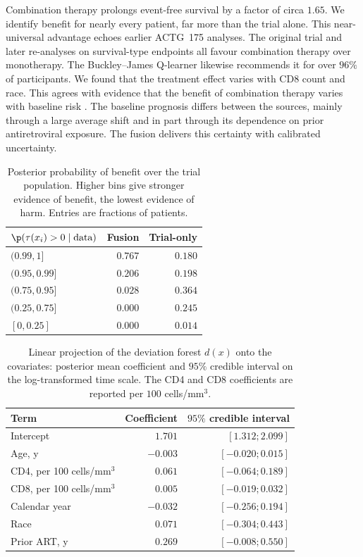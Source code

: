 Combination therapy prolongs event-free survival by a factor of circa $1.65$.
We identify benefit for nearly every patient, far more than the trial alone.
This near-universal advantage echoes earlier ACTG~175 analyses.
The original trial \citep{hammer1996} and later re-analyses on survival-type endpoints \citep{lee2026bjboost} all favour combination therapy over monotherapy.
The Buckley--James Q-learner \citep{lee2026bjboost} likewise recommends it for over $96\%$ of participants.
We found that the treatment effect varies with CD8 count and race.
This agrees with evidence that the benefit of combination therapy varies with baseline risk \citep{kennedy2023}.
The baseline prognosis differs between the sources, mainly through a large average shift and in part through its dependence on prior antiretroviral exposure.
The fusion delivers this certainty with calibrated uncertainty.

\begin{table}[!tb]
  \centering
  \caption{Posterior probability of benefit over the trial
    population. Higher bins give stronger evidence of benefit, the
    lowest evidence of harm. Entries are fractions of patients.}
  \label{tab:hte-summary}
  \small
  \begin{tabular}{@{}lrr@{}}
    \toprule
    $\p(\tau(x_i) > 0 \mid \text{data})$        & Fusion & Trial-only \\
    \midrule
    $(0.99, 1]$    & $0.767$ & $0.180$ \\
    $(0.95, 0.99]$ & $0.206$ & $0.198$ \\
    $(0.75, 0.95]$ & $0.028$ & $0.364$ \\
    $(0.25, 0.75]$ & $0.000$ & $0.245$ \\
    $[0, 0.25]$    & $0.000$ & $0.014$ \\
    \bottomrule
  \end{tabular}
\end{table}

\begin{table}[!tb]
  \centering
  \caption{Linear projection of the deviation forest
    $d(x)$ onto the covariates: posterior mean coefficient and $95\%$
    credible interval on the log-transformed time scale. The CD4 and CD8
    coefficients are reported per $100$ cells/mm$^3$.}
  \label{tab:projection}
  \small
  \begin{tabular}{@{}lrr@{}}
    \toprule
    Term          & Coefficient & $95\%$ credible interval \\
    \midrule
    Intercept     & $1.701$  & $[1.312;2.099]$ \\
    \midrule
    Age, y                    & $-0.003$ & $[-0.020;0.015]$ \\
    CD4, per 100 cells/mm$^3$ & $0.061$  & $[-0.064;0.189]$ \\
    CD8, per 100 cells/mm$^3$ & $0.005$  & $[-0.019;0.032]$ \\
    Calendar year & $-0.032$ & $[-0.256;0.194]$ \\
    Race          & $0.071$  & $[-0.304;0.443]$ \\
    Prior ART, y  & $0.269$  & $[-0.008;0.550]$ \\
    \bottomrule
  \end{tabular}
\end{table}
